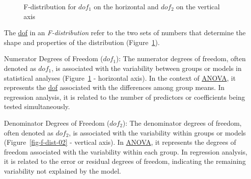 \documentclass[
  a4paper,
]{scrbook}
\begin{document}
\begin{figure}[ht]


\caption{\label{fig-f-dist-01}F-distribution for \(dof_1\) on the
horizontal and \(dof_2\) on the vertical axis}

\end{figure}%

The \hyperref[acronyms_dof]{dof} in an \emph{F-distribution} refer to
the two sets of numbers that determine the shape and properties of the
distribution (Figure~\ref{fig-f-dist-01}).

Numerator Degrees of Freedom (\(dof_1\)): The numerator degrees of
freedom, often denoted as \(dof_1\), is associated with the variability
between groups or models in statistical analyses
(Figure~\ref{fig-f-dist-01} - horizontal axis). In the context of
\hyperref[acronyms_ANOVA]{ANOVA}, it represents the
\hyperref[acronyms_dof]{dof} associated with the differences among group
means. In regression analysis, it is related to the number of predictors
or coefficients being tested simultaneously.

Denominator Degrees of Freedom (\(dof_2\)): The denominator degrees of
freedom, often denoted as \(dof_2\), is associated with the variability
within groups or models (Figure~\ref{fig-f-dist-02} - vertical axis). In
\hyperref[acronyms_ANOVA]{ANOVA}, it represents the degrees of freedom
associated with the variability within each group. In regression
analysis, it is related to the error or residual degrees of freedom,
indicating the remaining variability not explained by the model.
\end{document}
